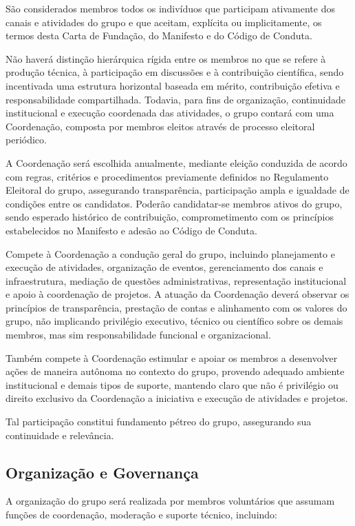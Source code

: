 \documentclass[
  12pt,          %
  a4paper,       %
  oneside,       %
  brazil         %
]{article}
\begin{document}
São considerados membros todos os indivíduos que participam ativamente dos canais e atividades do grupo e que aceitam, 
explícita ou implicitamente, os termos desta Carta de Fundação, do Manifesto e do Código de Conduta.

Não haverá distinção hierárquica rígida entre os membros no que se refere à produção técnica, 
à participação em discussões e à contribuição científica, sendo incentivada uma estrutura horizontal baseada em mérito, 
contribuição efetiva e responsabilidade compartilhada. Todavia, para fins de organização, continuidade institucional e 
execução coordenada das atividades, o grupo contará com uma Coordenação, composta por membros eleitos através de processo eleitoral periódico.

A Coordenação será escolhida anualmente, mediante eleição conduzida de acordo com regras, critérios e procedimentos previamente definidos no 
Regulamento Eleitoral do grupo, assegurando transparência, participação ampla e igualdade de condições entre os candidatos. 
Poderão candidatar-se membros ativos do grupo, sendo esperado histórico de contribuição, comprometimento com os princípios estabelecidos 
no Manifesto e adesão ao Código de Conduta.

Compete à Coordenação a condução geral do grupo, incluindo planejamento e execução de atividades, organização de eventos, 
gerenciamento dos canais e infraestrutura, mediação de questões administrativas, representação institucional e apoio à coordenação de projetos. 
A atuação da Coordenação deverá observar os princípios de transparência, prestação de contas e alinhamento com os 
valores do grupo, não implicando privilégio executivo, técnico ou científico sobre os demais membros, mas sim responsabilidade funcional e organizacional.


Também compete à Coordenação estimular e apoiar os membros a desenvolver ações de maneira autônoma no contexto do grupo, provendo adequado ambiente
institucional e demais tipos de suporte, mantendo claro que não é privilégio ou direito exclusivo da Coordenação a iniciativa e execução de atividades e projetos. 


Tal participação constitui fundamento pétreo do grupo, assegurando sua continuidade e relevância. 

\subsection{Organização e Governança}

A organização do grupo será realizada por membros voluntários que assumam funções de coordenação, moderação e suporte técnico, incluindo:
\end{document}
